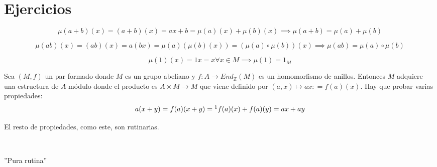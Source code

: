 \documentclass[openany]{book}
\begin{document}
\section{Ejercicios}
\setcounter{ex}{0}

\begin{exercise}


        $$ \mu(a+b)(x) = (a+b)(x) = ax + b = \mu(a)(x) + \mu(b)(x) \implies \mu(a+b) = \mu(a)+ \mu(b) $$

        $$ \mu(ab)(x) = (ab)(x) = a(bx) = \mu(a)(\mu(b)(x)) = (\mu(a) \circ \mu(b)) (x) \implies \mu(ab) = \mu(a) \circ \mu(b)$$

        $$ \mu(1)(x) = 1x = x \forall x \in M \implies \mu(1) = 1_{M} $$

        Sea $ (M,f)$ un par formado donde $ M$ es un grupo abeliano y $ f: A \to End_{\mathbb{Z}}(M)$ es un homomorfismo de anillos. Entonces $ M$ adquiere una estructura de $ A$-módulo donde el producto es $ A \times M \to M$ que viene definido por $ (a,x) \mapsto ax: = f(a)(x)$. Hay que probar varias propiedades:
        $$ a(x+y) = f(a) (x+y) =\footnote{$ f$ es un homomorfismo de grupos abelianos} f(a)(x) + f(a)(y) = ax+ay  $$

        El resto de propiedades, como este, son rutinarias.

\end{exercise}

\begin{exercise}
    $ $

    ''Pura rutina''
\end{exercise}
\end{document}
